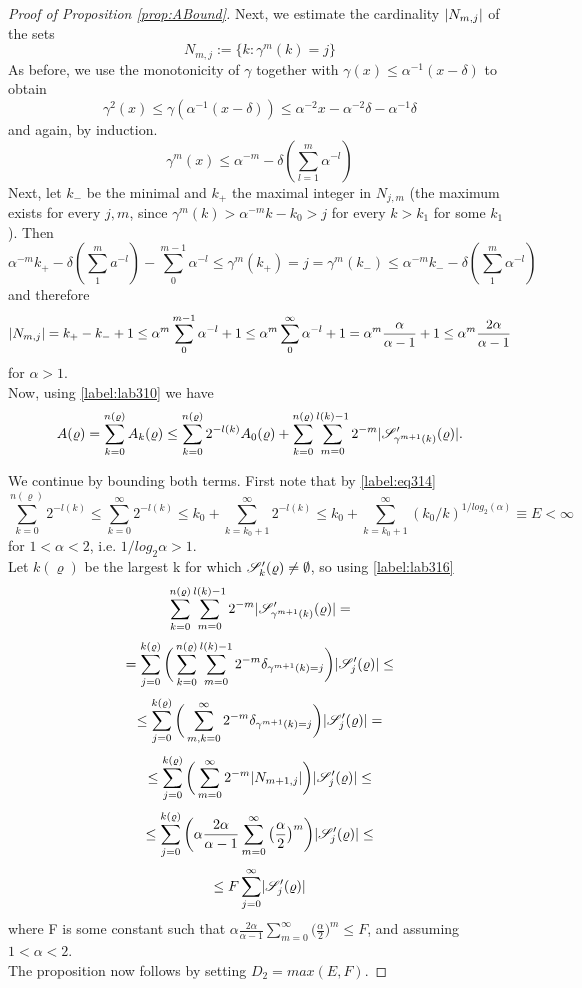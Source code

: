 \documentclass[11pt,reqno]{article}
\DeclarePairedDelimiter\abs{\lvert}{\rvert}%
\theoremstyle{definition}
\numberwithin{equation}{section}
\begin{document}
\begin{proof}[Proof of Proposition \eqref{prop:ABound}]
Next, we estimate the cardinality $\abs{N_{m,j}}$ of the sets
$$
N_{m,j} := \{k: \gamma^m(k) = j\}
$$
As before, we use the monotonicity of $\gamma$ together with $\gamma(x) \leq \alpha^{-1}(x-\delta)$ to obtain
$$
\gamma^2(x) \leq \gamma(\alpha^{-1}(x-\delta)) \leq \alpha^{-2}x - \alpha^{-2}\delta - \alpha^{-1}\delta 
$$
and again, by induction.
$$
\gamma^m(x) \leq \alpha^{-m}-\delta(\sum_{l=1}^m\alpha^{-l})
$$
Next, let $k_-$ be the minimal and $k_+$ the maximal integer in $N_{j,m}$ (the maximum exists for every $j,m$, since $\gamma^m(k) > \alpha^{-m}k - k_0 > j$ for every $k>k_1$ for some $k_1$). Then
$$
\alpha^{-m}k_+ - \delta(\sum_1^ma^{-l})-\sum_0^{m-1}\alpha^{-l} \leq \gamma^m(k_+) = j = \gamma^m(k_-) \leq \alpha^{-m}k_- - \delta(\sum_1^m\alpha^{-l})
$$
and therefore
\begin{equation} \label{label:lab316}
\abs{N_{m,j}} = k_+ - k_- + 1 \leq \alpha^m \sum_0^{m-1}\alpha^{-l} + 1 \leq \alpha^m \sum_0^{\infty}\alpha^{-l} + 1 = \alpha^m \frac{\alpha}{\alpha-1} + 1 \leq \alpha^m \frac{2\alpha}{\alpha-1}
\end{equation}
for $\alpha > 1$.\\

Now, using \eqref{label:lab310} we have
\begin{equation} 
A(\varrho) = \sum_{k=0}^{n(\varrho)}A_k(\varrho) \leq 
\sum_{k=0}^{n(\varrho)} 2^{-l(k)}A_0(\varrho) + 
\sum_{k=0}^{n(\varrho)}\sum_{m=0}^{l(k)-1} 2^{-m} \abs{\mathscr{S}^\prime_{\gamma^{m+1}(k)}(\varrho)} .
\end{equation}

We continue by bounding both terms. First note that by \eqref{label:eq314}
$$
\sum_{k=0}^{n(\varrho)} 2^{-l(k)} \leq \sum_{k=0}^{\infty} 2^{-l(k)} \leq k_0 + \sum_{k=k_0+1}^{\infty} 2^{-l(k)} \leq k_0 + \sum_{k=k_0+1}^{\infty}(k_0/k)^{1/log_2(\alpha)} \equiv E < \infty
$$
for $1 < \alpha < 2$, i.e. $1/log_2\alpha > 1$. \\
Let $k(\varrho)$ be the largest k for which $\mathscr{S}^\prime_k(\varrho) \neq \emptyset$, so using \eqref{label:lab316}
$$
\sum_{k=0}^{n(\varrho)}\sum_{m=0}^{l(k)-1} 2^{-m} \abs{\mathscr{S}^\prime_{\gamma^{m+1}(k)}(\varrho)} = 
$$
$$
=\sum_{j=0}^{k(\varrho)} \bigg( \sum_{k=0}^{n(\varrho)}\sum_{m=0}^{l(k)-1} 2^{-m} \delta_{\gamma^{m+1}(k) = j} \bigg) \abs{\mathscr{S}^\prime_{j}(\varrho)} \leq
$$
$$
\leq \sum_{j=0}^{k(\varrho)} \bigg( \sum_{m,k=0}^{\infty} 2^{-m} \delta_{\gamma^{m+1}(k) = j} \bigg) \abs{\mathscr{S}^\prime_{j}(\varrho)} = 
$$
$$
\leq \sum_{j=0}^{k(\varrho)} \bigg( \sum_{m=0}^{\infty} 2^{-m} \abs{N_{m+1,j}} \bigg) \abs{\mathscr{S}^\prime_{j}(\varrho)} \leq
$$
$$
\leq \sum_{j=0}^{k(\varrho)} \bigg( \alpha \frac{2\alpha}{\alpha-1} \sum_{m=0}^{\infty} \big( \frac{\alpha}{2} \big) ^m \bigg) \abs{\mathscr{S}^\prime_{j}(\varrho)} \leq
$$
$$
\leq F\sum_{j=0}^{\infty} \abs{\mathscr{S}^\prime_{j}(\varrho)}
$$
where F is some constant such that $\alpha \frac{2\alpha}{\alpha-1} \sum_{m=0}^{\infty} \big( \frac{\alpha}{2} \big) ^m \leq F$, and assuming $1 < \alpha < 2$.\\
The proposition now follows by setting $D_2 = max(E,F)$.
\end{proof}
\end{document}
